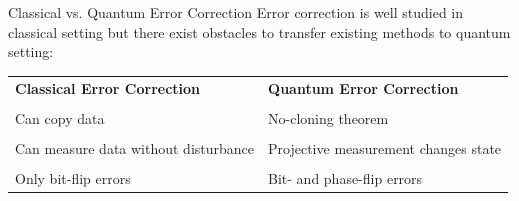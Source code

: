 \documentclass{dfki}
\begin{document}
\begin{frame}{Classical vs. Quantum Error Correction}
	Error correction is well studied in classical setting but there exist obstacles to transfer existing methods to quantum setting:
	\begin{center}
        \begin{tabular}{p{7cm}|p{7cm}}
            \textbf{Classical Error Correction} & \textbf{Quantum Error Correction} \\
			\vspace{0.5cm}\\
            Can copy data & No-cloning theorem \\
			\vspace{0.5cm}\\
            Can measure data without disturbance & Projective measurement changes state \\
			\vspace{0.5cm}\\
            Only bit-flip errors & Bit- and phase-flip errors \\
        \end{tabular}
    \end{center}
\end{frame}
\end{document}
